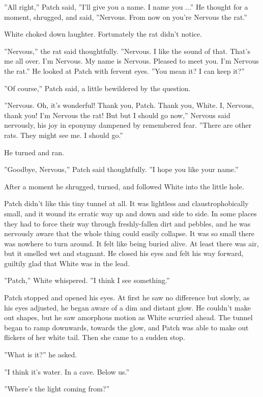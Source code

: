 \documentclass[12pt]{book}
\begin{document}
''All right,'' Patch said, ''I'll give you a name. I name you ...'' He thought for a moment, shrugged, and said, ''Nervous. From now on you're Nervous the rat.''

White choked down laughter. Fortunately the rat didn't notice.

''Nervous,'' the rat said thoughtfully. ''Nervous. I like the sound of that. That's me all over. I'm Nervous. My name is Nervous. Pleased to meet you. I'm Nervous the rat.'' He looked at Patch with fervent eyes. ''You mean it? I can keep it?''

''Of course,'' Patch said, a little bewildered by the question.

''Nervous. Oh, it's wonderful! Thank you, Patch. Thank you, White. I, Nervous, thank you! I'm Nervous the rat! But %
but I should go now,'' Nervous said nervously, his joy in eponymy dampened by remembered fear. ''There are other rats. They might see me. I should go.''

He turned and ran.

''Goodbye, Nervous,'' Patch said thoughtfully. ''I hope you like your name.''

After a moment he shrugged, turned, and followed White into the little hole.

Patch didn't like this tiny tunnel at all. It was lightless and claustrophobically small, and it wound its erratic way up and down and side to side. In some places they had to force their way through freshly-fallen dirt and pebbles, and he was nervously aware that the whole thing could easily collapse. It was so small there was nowhere to turn around. It felt like being buried alive. At least there was air, but it smelled wet and stagnant. He closed his eyes and felt his way forward, guiltily glad that White was in the lead.

''Patch,'' White whispered. ''I think I see something.''

Patch stopped and opened his eyes. At first he saw no difference %
but slowly, as his eyes adjusted, he began aware of a dim and distant glow. He couldn't make out shapes, but he saw amorphous motion as White scurried ahead. The tunnel began to ramp downwards, towards the glow, and Patch was able to make out flickers of her white tail. Then she came to a sudden stop.

''What is it?'' he asked.

''I think it's water. In a cave. Below us.''

''Where's the light coming from?''
\end{document}
